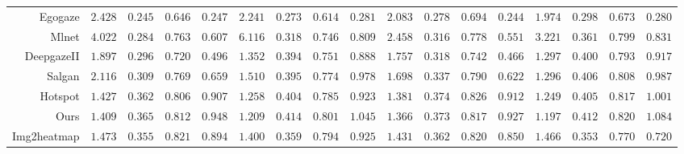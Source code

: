 \documentclass[journal,twoside]{IEEEtran}
\begin{document}
\begin{table*}[!t]
\begin{center}
\begin{tabular}{r|cccc|cccc|cccc|cccc}
   Egogaze \cite{DBLP:conf/eccv/HuangCLS18} & 	\cellcolor{gray!20}$2.428$ & $0.245$ & $0.646$ & 	$0.247$ &	 \cellcolor{gray!20}$2.241$ & $0.273$ & $0.614$ & $0.281$ & \cellcolor{gray!20}$2.083$ & $0.278$ &	$0.694$ & $0.244$ & \cellcolor{gray!20}$1.974$ & $0.298$ & $0.673$ & $0.280$    \\
   Mlnet \cite{DBLP:conf/icpr/CorniaBSC16}	& $4.022$ &	\cellcolor{gray!20}$0.284$	& \cellcolor{gray!35}$0.763$ &	\cellcolor{gray!35}$0.607$ & $6.116$ & \cellcolor{gray!20}$0.318$ & \cellcolor{gray!20}$0.746$ &	\cellcolor{gray!20}$0.809$ & $2.458$ & \cellcolor{gray!20}$0.316$ & \cellcolor{gray!35}$0.778$ &	\cellcolor{gray!35}$0.551$ & $3.221$ & \cellcolor{gray!20}$0.361$ & \cellcolor{gray!35}$0.799$ &	\cellcolor{gray!20}$0.831$   \\
   DeepgazeII \cite{DBLP:journals/corr/KummererWB16}	& \cellcolor{gray!50}$1.897$ & \cellcolor{gray!35}$0.296$ & \cellcolor{gray!20}$0.720$ & \cellcolor{gray!20}$0.496$ & \cellcolor{gray!50}$1.352$ & \cellcolor{gray!35}$0.394$ & \cellcolor{gray!35}$0.751$ & \cellcolor{gray!35}$0.888$ & \cellcolor{gray!35}$1.757$ & \cellcolor{gray!35}$0.318$ & \cellcolor{gray!20}$0.742$ & \cellcolor{gray!20}$0.466$ & \cellcolor{gray!35}$1.297$ & \cellcolor{gray!35}$0.400$ & \cellcolor{gray!20}$0.793$ & \cellcolor{gray!35}$0.917$   \\
   Salgan \cite{Pan_2017_SalGAN}	& $2.116$\cellcolor{gray!35} & \cellcolor{gray!50}$0.309$ & \cellcolor{gray!50}$0.769$ & \cellcolor{gray!50}$0.659$ & \cellcolor{gray!35}$1.510$ & \cellcolor{gray!50}$0.395$ & \cellcolor{gray!50}$0.774$ & \cellcolor{gray!70}$0.978$ & \cellcolor{gray!50}$1.698$ & \cellcolor{gray!50}$0.337$ & \cellcolor{gray!50}$0.790$ & \cellcolor{gray!50}$0.622$ & \cellcolor{gray!50}$1.296$ & \cellcolor{gray!70}$0.406$ & \cellcolor{gray!50}$0.808$ & \cellcolor{gray!50}$0.987$    \\
   Hotspot \cite{interaction-hotspots} & \cellcolor{gray!70}$1.427$ & \cellcolor{gray!70}$0.362$ & \cellcolor{gray!70}$0.806$ & \cellcolor{gray!70}$0.907$ & \cellcolor{gray!70}$1.258$ & \cellcolor{gray!70}$0.404$ & \cellcolor{gray!70}$0.785$ & \cellcolor{gray!50}$0.923$ & \cellcolor{gray!70}$1.381$ & \cellcolor{gray!95}$0.374$ & \cellcolor{gray!95}$0.826$ & \cellcolor{gray!70}$0.912$ & \cellcolor{gray!70}$1.249$ & \cellcolor{gray!50}$0.405$ & \cellcolor{gray!70}$0.817$ & \cellcolor{gray!70}$1.001$   \\
   \hline
   Ours & \cellcolor{gray!95}$1.409$ & \cellcolor{gray!95}$0.365$ & \cellcolor{gray!95}$0.812$ & \cellcolor{gray!95}$0.948$ & \cellcolor{gray!95}$1.209$ & \cellcolor{gray!95}$0.414$ & \cellcolor{gray!95}$0.801$ & \cellcolor{gray!95}$1.045$ & \cellcolor{gray!95}$1.366$ & \cellcolor{gray!70}$0.373$ & \cellcolor{gray!70}$0.817$	 & \cellcolor{gray!95}$0.927$ & \cellcolor{gray!95}$1.197$ & \cellcolor{gray!95}$0.412$ & \cellcolor{gray!95}$0.820$ & \cellcolor{gray!95}$1.084$    \\
   \hline
   Img2heatmap \cite{interaction-hotspots} & $1.473$ & $0.355$ & $0.821$ & $0.894$ & $1.400$ & $0.359$ & $0.794$ & $0.925$ & $1.431$ & $0.362$ & $0.820$ & $0.850$ & $1.466$ & $0.353$ & $0.770$ & $0.720$   \\


\end{tabular}
\end{center}
\end{table*}
\end{document}
